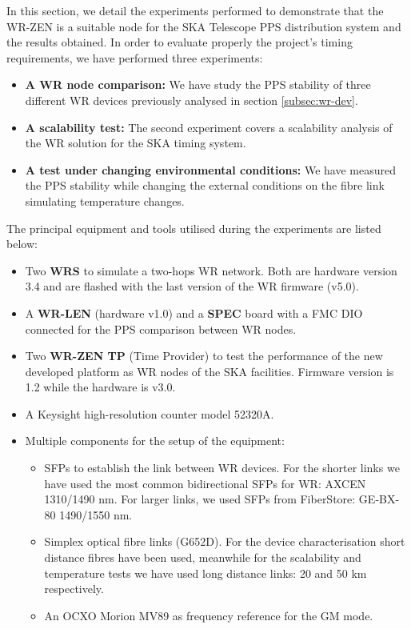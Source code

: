 
In this section, we detail the experiments performed to demonstrate that the WR-ZEN is a suitable node for the SKA Telescope PPS distribution system and the results obtained. 
In order to evaluate properly the project's timing requirements, we have performed three experiments:

\begin{itemize}
	\item \textbf{A WR node comparison:} We have study the PPS stability of three different WR devices 
	previously analysed in section \ref{subsec:wr-dev}.
	\item \textbf{A scalability test:} The second experiment covers a 
	scalability analysis of the WR solution for the SKA timing system.
	\item \textbf{A test under changing environmental conditions:} We have measured 
	the PPS stability while changing the external conditions on the fibre 
	link simulating temperature changes.
\end{itemize}

The principal equipment and tools utilised during the experiments are listed 
below:

\begin{itemize}
    \item Two \textbf{WRS} to simulate a two-hops WR network. Both are 
    hardware version 3.4 and are flashed with the last version of the WR 
    firmware (v5.0).
    
    \item A \textbf{WR-LEN} (hardware v1.0) and a \textbf{SPEC} board with a FMC 
    DIO connected for the PPS comparison between WR nodes.
    
    \item Two \textbf{WR-ZEN TP} (Time Provider) to test the 
    performance of the new developed platform as WR nodes of the SKA 
    facilities. Firmware version is 1.2 while the hardware is v3.0.
    
    \item A Keysight high-resolution counter model 52320A.
    
    \item Multiple components for the setup of the equipment:
    \begin{itemize}
        \item SFPs to establish the link between WR devices. For the shorter links we have used the most common bidirectional SFPs for WR: AXCEN 1310/1490 nm. For larger links, we used SFPs from FiberStore: GE-BX-80 1490/1550 nm.
        \item Simplex optical fibre links (G652D). For the device 
        characterisation short distance fibres have been used, meanwhile for 
        the scalability and temperature tests we have used long distance links: 
        20 and 50 km respectively.
        \item An OCXO Morion MV89 as frequency reference for the GM mode.
    \end{itemize}
    
\end{itemize}

